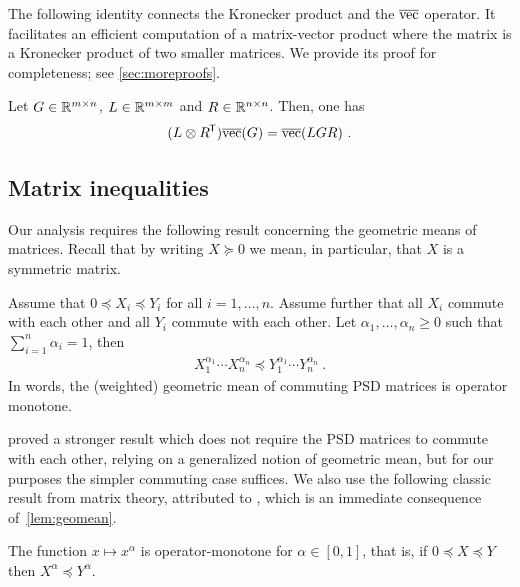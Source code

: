 The following identity connects the Kronecker product and the $\vec$
operator. It facilitates an efficient computation of a
matrix-vector product where the matrix is a Kronecker product
of two smaller matrices. We provide its proof for completeness; see \cref{sec:moreproofs}.

\begin{lemma} \label{lem:vec-kron}
Let $G \in \reals^{m\times n}$, $L \in \reals^{m\times m}$ and $R\in \reals^{n\times n}$. 
Then, one has
\begin{align*}
	(L \kron R\tr)\vec(G) = \vec(L G R) ~ .
\end{align*}
\end{lemma}


\subsection{Matrix inequalities}

Our analysis requires the following result concerning the
geometric means of matrices.
Recall that by writing $X \succeq 0$ we mean, in particular, that $X$ is a symmetric matrix.

\begin{lemma} \label{lem:geomean}
Assume that $0 \preceq X_i \preceq Y_i$ for all $i=1,\ldots,n$.
Assume further that all $X_i$ commute with each other and all $Y_i$
commute with each other. Let $\alpha_1,\ldots,\alpha_n \ge 0$
such that $\sum_{i=1}^n \alpha_i = 1$, then
\begin{align*}
X_1^{\alpha_1} \cdots X_n^{\alpha_n} \preceq
Y_1^{\alpha_1} \cdots Y_n^{\alpha_n} ~ .
\end{align*}
In words, the (weighted) geometric mean of commuting PSD matrices
is operator monotone.
\end{lemma}

\citet{ando2004geometric} proved a stronger result which does not require the
PSD matrices to commute with each other, relying on a generalized notion of
geometric mean, but for our purposes the simpler commuting case suffices.  We
also use the following classic result from matrix theory, attributed to
\citet{lowner1934monotone}, which is an immediate consequence of~\cref{lem:geomean}.

\begin{lemma} \label{lem:monotone}
The function $x \mapsto x^\alpha$ is operator-monotone for
$\alpha \in [0,1]$, that is, if $0 \preceq X \preceq Y$
then $X^\alpha \preceq Y^\alpha$.
\end{lemma}


